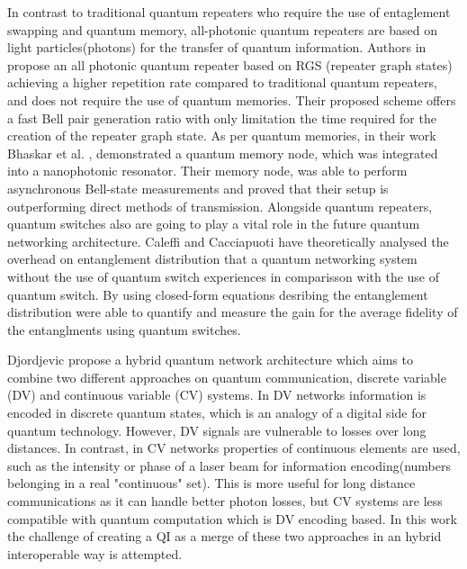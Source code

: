 \documentclass[12pt]{ieeetj}
\begin{document}
		In contrast to traditional quantum repeaters who require the use of entaglement swapping and quantum memory, all-photonic quantum repeaters
		are based on light particles(photons) for the transfer of quantum information.
		Authors in \cite{repeater1} propose an all photonic quantum repeater 
		based on RGS (repeater graph states) achieving a higher repetition rate compared to traditional quantum repeaters, and does not require 
		the use of quantum memories. Their proposed scheme offers a fast Bell pair generation ratio with only
		limitation the time required for the creation of the repeater graph state. 
		As per quantum memories, in their work Bhaskar et al. \cite{memories}, demonstrated a quantum memory node, which
		was integrated into a nanophotonic resonator. Their memory node, was able to perform asynchronous Bell-state measurements
		and proved that their setup is outperforming direct methods of transmission. Alongside quantum repeaters, quantum switches also
		are going to play a vital role in the future quantum networking architecture. Caleffi and Cacciapuoti \cite{quantum-switch1}
		have theoretically analysed the overhead on entanglement distribution that a quantum networking system 
		without the use of quantum switch experiences in comparisson with the use of quantum switch. By using closed-form equations
		desribing the entanglement distribution were able to quantify and measure the gain for the average fidelity of the entanglments
		using quantum switches.
	
	

		Djordjevic\cite{cvdv} propose a hybrid quantum network architecture which aims to combine two different approaches
		on quantum communication, discrete variable (DV) and continuous variable (CV) systems. 
		In DV networks information is encoded in discrete quantum states, which is an analogy of a digital side for quantum technology.
		However, DV signals are vulnerable to losses over long distances. In contrast, in CV networks properties of continuous elements are used,
		such as the intensity or phase of a laser beam for information encoding(numbers belonging in a real "continuous" set). 
		This is more useful for long distance communications as it can handle better photon losses, but CV systems are less compatible with quantum computation
		which is DV encoding based. In this work the challenge of creating a QI as a merge of these two approaches in an
		hybrid interoperable way is attempted.
\end{document}
